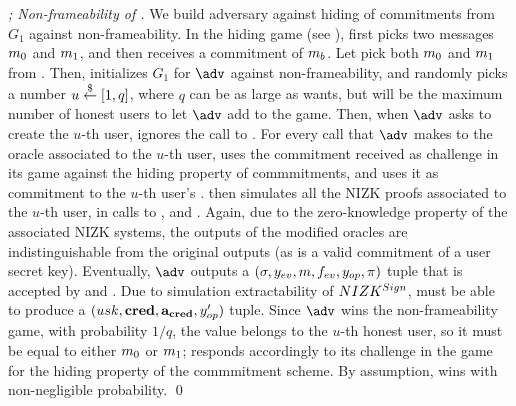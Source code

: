 \begin{proof}[; Non-frameability of \CUASGen]
  We build adversary \advB against hiding of commitments from $G_1$ against
  non-frameability. In the hiding game (see ), \advB first
  picks two messages $m_0$ and $m_1$, and then receives a commitment \Ccom
  of $m_b$. Let \advB pick both $m_0$ and $m_1$ from \AttrSpace. Then,
  \advB initializes $G_1$ for $\adv$ against non-frameability, and randomly
  picks a number $u \stackrel{\$}{\gets} [1,q]$, where $q$ can be as large as \advB wants, but
  will be the maximum number of honest users to let $\adv$ add to the game.
  Then, when $\adv$ asks to create the $u$-th user, \advB ignores the call to
  \UKeyGen. For every call that $\adv$ makes to the \OBTAIN oracle associated to
  the $u$-th user, \advB uses the commitment \Ccom received as challenge in its
  game against the hiding property of commmitments, and uses it as commitment to
  the $u$-th user's \usk. \advB then simulates all the NIZK proofs associated to
  the $u$-th user, in calls to \OBTAIN, \SIGN and \INSPECT. Again, due to the
  zero-knowledge property of the associated NIZK systems, the outputs of the
  modified oracles are indistinguishable from the original outputs (as \Ccom
  is a valid commitment of a user secret key). Eventually, $\adv$ outputs a
  $(\sigma,y_{ev},m,f_{ev},y_{op},\pi)$ tuple that is accepted by \Verify
  and \Judge. Due to simulation extractability of $NIZK^{Sign}$, \ExtractSign
  must be able to produce a $(usk,\mathbf{cred},\mathbf{a}_{\mathbf{cred}},y_{op}')$ tuple. Since
  $\adv$ wins the non-frameability game, with probability $1/q$,
  the \usk value belongs to the $u$-th honest user, so it must be equal to
  either $m_0$ or $m_1$; \advB responds accordingly to its challenge in
  the game for the hiding property of the commmitment scheme. By assumption,
  \advB wins with non-negligible probability.
  \qed
\end{proof}


